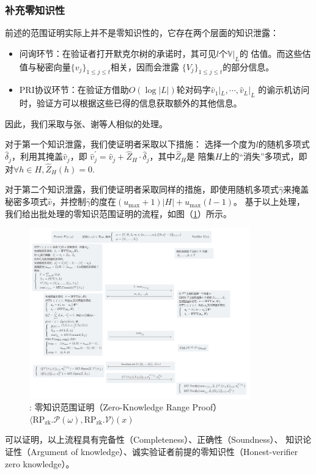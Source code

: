 \documentclass[zihao=-4]{ctexart}
\begin{document}
\begin{spacing}{1.5}
\subsubsection{补充零知识性}
前述的范围证明实际上并不是零知识性的，它存在两个层面的知识泄露：
\begin{itemize}
  \item 问询环节：在验证者打开默克尔树的承诺时，其可见$l$个$\mathbb{V}|_L$的
        估值。而这些估值与秘密向量$\{v_j\}_{1\le j\le t}$相关，因而会泄露
        $\{V_j\}_{1\le j\le t}$的部分信息。
  \item PRI协议环节：在验证方借助$O(\log{|L|})$轮对码字$\hat{v}_1|_L,\cdots,\hat{v}_L|_L$
        的谕示机访问时，验证方可以根据这些已得的信息获取额外的其他信息。
\end{itemize}\par
因此，我们采取与张、谢等人\cite{Fourty-two}相似的处理。\par
对于第一个知识泄露，我们使证明者采取以下措施：
选择一个度为$l$的随机多项式$\hat{\delta}_j$，利用其掩盖$\hat{v}_j$，即
$\hat{v}^{\prime}_j=\hat{v}_j+\hat{Z}_H\cdot\hat{\delta}_j$，其中$\hat{Z}_H$是
陪集$H$上的“消失”多项式，即对$\forall h\in H,\hat{Z}_H(h)=0$.\par
对于第二个知识泄露，我们使证明者采取同样的措施，即使用随机多项式$\hat{\gamma}$来掩盖
秘密多项式$\hat{v}$，并控制$\hat{\gamma}$的度在$(u_{\max}+1)|H|+u_{\max}(l-1)$。
基于以上处理，我们给出批处理的零知识范围证明的流程，如图（\ref{ZKRP流程}）所示。
\begin{figure}[H]
  \centering
  \includegraphics[width=0.85\textwidth]{./include_picture/ZKRP.png}
  \caption{: 零知识范围证明（Zero-Knowledge Range Proof）$\langle \text{RP}_{\text{zk}}.\mathcal{P}(\omega),\text{RP}_{\text{zk}}.\mathcal{V}\rangle(x)$}
  \label{ZKRP流程}
\end{figure}\par
可以证明，以上流程具有完备性（Completeness）、正确性（Soundness）、
知识论证性（Argument of knowledge）、诚实验证者前提的零知识性（Honest-verifier zero knowledge）。


\end{spacing}
\end{document}
